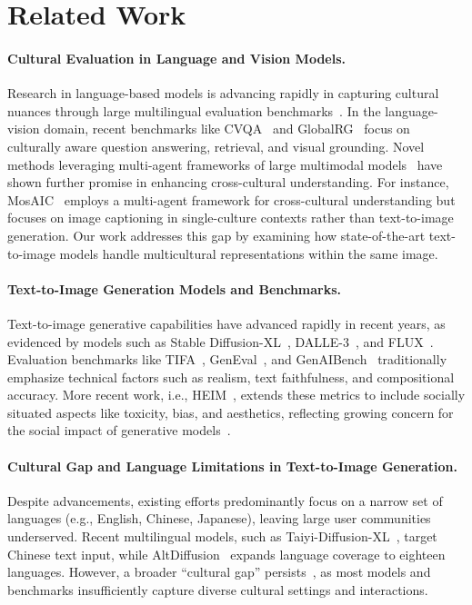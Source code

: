 \section{Related Work}
\paragraph{Cultural Evaluation in Language and Vision Models.}

Research in language-based models is advancing rapidly in capturing cultural nuances through large multilingual evaluation benchmarks~\cite{pawar2024survey,romanou2024include,singh2024global}. In the language-vision domain, recent benchmarks like CVQA~\cite{romero2024cvqaculturallydiversemultilingualvisual} and GlobalRG~\cite{bhatia-etal-2024-local} focus on culturally aware question answering, retrieval, and visual grounding. Novel methods leveraging multi-agent frameworks of large multimodal models~\cite{guo2024large, han2024llm} have shown further promise in enhancing cross-cultural understanding. For instance, MosAIC~\cite{bai2024power} employs a multi-agent framework for cross-cultural understanding but focuses on image captioning in single-culture contexts rather than text-to-image generation. Our work addresses this gap by examining how state-of-the-art text-to-image models handle multicultural representations within the same image.
\vspace{-0.8em}
\paragraph{Text-to-Image Generation Models and Benchmarks.} Text-to-image generative capabilities have advanced rapidly in recent years, as evidenced by models such as Stable Diffusion-XL~\cite{podell2023sdxl}, DALLE-3~\cite{betker2023improving}, and FLUX~\cite{flux2023}. Evaluation benchmarks like TIFA~\cite{hu2023tifa}, GenEval~\cite{ghosh2024geneval}, and GenAIBench~\cite{lin2025evaluating} traditionally emphasize technical factors such as realism, text faithfulness, and compositional accuracy. More recent work, i.e., HEIM~\cite{lee2024holistic}, extends these metrics to include socially situated aspects like toxicity, bias, and aesthetics, reflecting growing concern for the social impact of generative models~\cite{hartwig2024evaluating}.
\vspace{-0.8em}
\paragraph{Cultural Gap and Language Limitations in Text-to-Image Generation.} Despite advancements, existing efforts predominantly focus on a narrow set of languages (e.g., English, Chinese, Japanese), leaving large user communities underserved. 
Recent multilingual models, such as Taiyi-Diffusion-XL~\cite{wu2024taiyi}, target Chinese text input, while AltDiffusion~\cite{ye2024altdiffusion} expands language coverage to eighteen languages. However, a broader ``cultural gap'' persists~\cite{liu2024cultural}, as most models and benchmarks insufficiently capture diverse cultural settings and interactions.
\vspace{-0.8em}
